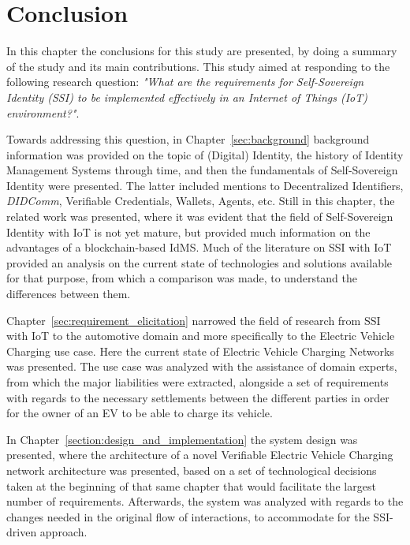 \section{Conclusion}
\label{sec:conclusion}

In this chapter the conclusions for this study are presented, by doing a summary of the study and its main contributions.
This study aimed at responding to the following research question: \textit{"What are the requirements for Self-Sovereign Identity (SSI) to be implemented effectively in an Internet of Things (IoT) environment?"}.

Towards addressing this question, in Chapter~\ref{sec:background} background information was provided on the topic of (Digital) Identity, the history of Identity Management Systems through time, and then the fundamentals of Self-Sovereign Identity were presented. The latter included mentions to Decentralized Identifiers, \textit{DIDComm}, Verifiable Credentials, Wallets, Agents, etc. Still in this chapter, the related work was presented, where it was evident that the field of Self-Sovereign Identity with IoT is not yet mature, but provided much information on the advantages of a blockchain-based IdMS. Much of the literature on SSI with IoT provided an analysis on the current state of technologies and solutions available for that purpose, from which a comparison was made, to understand the differences between them.

Chapter~\ref{sec:requirement_elicitation} narrowed the field of research from SSI with IoT to the automotive domain and more specifically to the Electric Vehicle Charging use case. Here the current state of Electric Vehicle Charging Networks was presented. The use case was analyzed with the assistance of domain experts, from which the major liabilities were extracted, alongside a set of requirements with regards to the necessary settlements between the different parties in order for the owner of an EV to be able to charge its vehicle. 

In Chapter~\ref{section:design_and_implementation} the system design was presented, where the architecture of a novel Verifiable Electric Vehicle Charging network architecture was presented, based on a set of technological decisions taken at the beginning of that same chapter that would facilitate the largest number of requirements. Afterwards, the system was analyzed with regards to the changes needed in the original flow of interactions, to accommodate for the SSI-driven approach.

